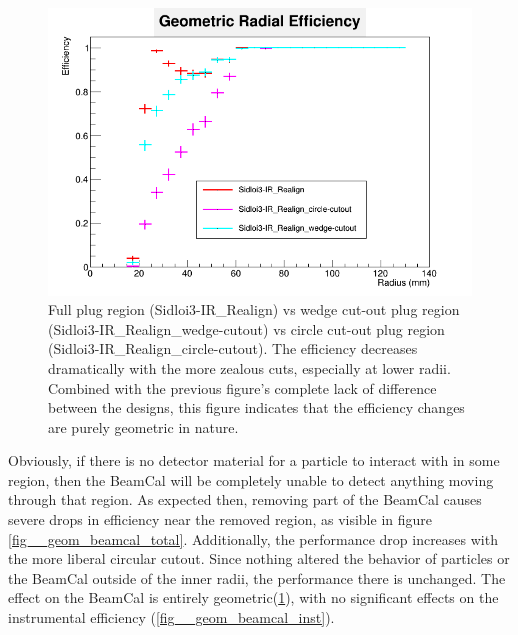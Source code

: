 \documentclass{report}
\begin{document}
                \begin{figure}[H]
                    \includegraphics[height=.4\textheight]{RadialEfficiency_geometric_geom}
                    \centering
                    \caption{Full plug region (Sidloi3-IR\_Realign) vs wedge cut-out plug region
                            (Sidloi3-IR\_Realign\_wedge-cutout) vs circle cut-out plug region
                            (Sidloi3-IR\_Realign\_circle-cutout). The efficiency decreases dramatically 
                            with the more zealous cuts, especially at lower radii. Combined with the 
                            previous figure's complete lack of difference between the designs, this figure
                            indicates that the efficiency changes are purely geometric in nature.}
                    \label{fig__geom_beamcal_geom}
                \end{figure}

                Obviously, if there is no detector material for a particle to interact with in some region, then the BeamCal will be completely unable to detect anything moving through that region. As expected then, removing part of the BeamCal causes severe drops in efficiency near the removed region, as visible in figure \ref{fig__geom_beamcal_total}. Additionally, the performance drop increases with the more liberal circular cutout. Since nothing altered the behavior of particles or the BeamCal outside of the inner radii, the performance there is unchanged. The effect on the BeamCal is entirely geometric(\ref{fig__geom_beamcal_geom}), with no significant effects on the instrumental efficiency (\ref{fig__geom_beamcal_inst}).
                
\end{document}
